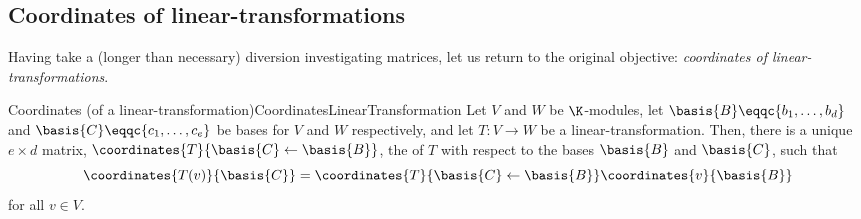 \subsection{Coordinates of linear-transformations}\label{sbs3.2.2}

Having take a (longer than necessary) diversion investigating matrices, let us return to the original objective:  \emph{coordinates of linear-transformations}.
\begin{thm}{Coordinates (of a linear-transformation)}{CoordinatesLinearTransformation}
	Let $V$ and $W$ be $\K$-modules, let $\basis{B}\eqqc \{ b_1,\ldots ,b_d\}$ and $\basis{C}\eqqc \{ c_1,\ldots ,c_e\}$ be bases for $V$ and $W$ respectively, and let $T\colon V\rightarrow W$ be a linear-transformation.  Then, there is a unique $e\times d$ matrix, $\coordinates{T}{\basis{C}\leftarrow \basis{B}}$, the  of $T$ with respect to the bases $\basis{B}$ and $\basis{C}$, such that
	\begin{equation}\label{eqn1.2.115}
		\coordinates{T(v)}{\basis{C}}=\coordinates{T}{\basis{C}\leftarrow \basis{B}}\coordinates{v}{\basis{B}}
	\end{equation}
	for all $v\in V$.
	

\end{thm}

